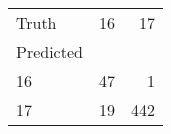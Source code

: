 \begin{tabular}{lrr}
\toprule
Truth & 16 & 17 \\
Predicted &  &  \\
\midrule
16 & 47 & 1 \\
17 & 19 & 442 \\
\bottomrule
\end{tabular}

